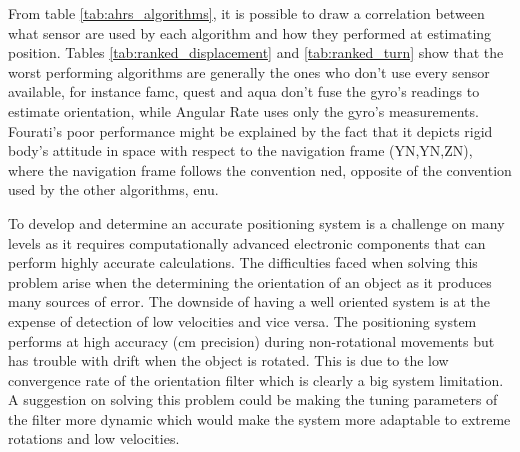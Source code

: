 From table \ref{tab:ahrs_algorithms}, it is possible to draw a correlation between what sensor are used by each algorithm and how they performed at estimating position. Tables \ref{tab:ranked_displacement} and \ref{tab:ranked_turn} show that the worst performing algorithms are generally the ones who don't use every sensor available, for instance \acrshort{famc}, \acrshort{quest} and \acrshort{aqua} don't fuse the gyro's readings to estimate orientation, while Angular Rate uses only the gyro's measurements. Fourati's poor performance might be explained by the fact that it depicts rigid body's attitude in space with respect to the navigation frame (YN,YN,ZN), where the navigation frame follows the convention \acrfull{ned}, opposite of the convention used by the other algorithms, \acrfull{enu}.

To develop and determine an accurate positioning system is a challenge on many levels as it requires computationally advanced electronic components that can perform highly accurate calculations. The difficulties faced when solving this problem arise when the determining the orientation of an object as it produces many sources of error. The downside of having a well oriented system is at the expense of detection of low velocities and vice versa. The positioning system performs at high accuracy (cm precision) during non-rotational movements but has trouble with drift when the object is rotated. This is due to the low convergence rate of the orientation filter which is clearly a big system limitation. A suggestion on solving this problem could be making the tuning parameters of the filter more dynamic which would make the system more adaptable to extreme rotations and low velocities.

